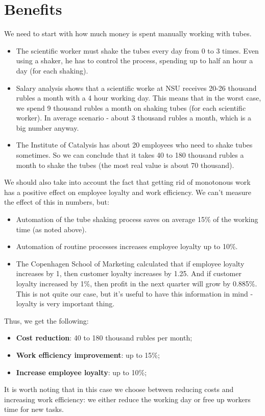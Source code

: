 \section{Benefits}

We need to start with how much money is spent manually working with tubes.

\begin{itemize}
\item The scientific worker must shake the tubes every day from 0 to 3 times. Even using a shaker, he has to control the process, spending up to half an hour a day (for each shaking). 

\item Salary analysis shows that a scientific worke at NSU receives 20-26 thousand rubles a month with a 4 hour working day. This means that in the worst case, we spend 9 thousand rubles a month on shaking tubes (for each scientific worker). In average scenario - about 3 thousand rubles a month, which is a big number anyway.

\item The Institute of Catalysis has about 20 employees who need to shake tubes sometimes. So we can conclude that it takes 40 to 180 thousand rubles a month to shake the tubes (the most real value is about 70 thousand).
\end{itemize}
We should also take into account the fact that getting rid of monotonous work has a positive effect on employee loyalty and work efficiency. We can't measure the effect of this in numbers, but: 
\begin{itemize}
    \item Automation of the tube shaking process saves on average 15\% of the working time (as noted above).
    \item Automation of routine processes increases employee loyalty up to 10\%.
    \item The Copenhagen School of Marketing calculated that if employee loyalty increases by 1, then customer loyalty increases by 1.25. And if customer loyalty increased by 1\%, then profit in the next quarter will grow by 0.885\%. This is not quite our case, but it’s useful to have this information in mind - loyalty is very important thing.
\end{itemize}
Thus, we get the following:
\begin{itemize}
    \item \textbf{Cost reduction}: 40 to 180 thousand rubles per month;
    \item \textbf{Work efficiency improvement}: up to 15\%;
    \item \textbf{Increase employee loyalty}: up to 10\%;
\end{itemize}
It is worth noting that in this case we choose between reducing costs and increasing work efficiency: we either reduce the working day or free up workers time for new tasks.

